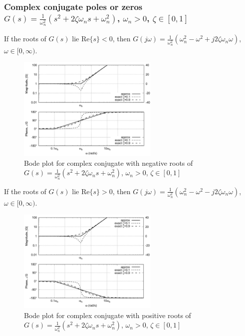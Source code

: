 \documentclass[letterpaper,12pt]{article}
\begin{document}
\subsubsection{Complex conjugate poles or zeros $G(s) = \frac{1}{\omega_{n}^2} (s^2 + 2\zeta \omega_n s + \omega_n^2)$, $\omega_n > 0$, $\zeta \in [0, 1]$}
If the roots of $G(s)$ lie Re$\{s\} < 0$, then $G(j \omega) = \frac{1}{\omega_{n}^2} (\omega_n^2 - \omega^2 + j2\zeta \omega_n \omega)$, $\omega \in [0, \infty)$.
\begin{figure}[h]
    \centering
    \includegraphics[width=0.6\textwidth]{case6 complex conjugate negative.png}
    \caption{Bode plot for complex conjugate with negative roots of $G(s) = \frac{1}{\omega_{n}^2} 
    (s^2 + 2\zeta \omega_n s + \omega_n^2)$, $\omega_n > 0$, $\zeta \in [0, 1]$}
\end{figure}
\FloatBarrier
If the roots of $G(s)$ lie Re$\{s\} > 0$, then $G(j \omega) = \frac{1}{\omega_{n}^2} (\omega_n^2 - \omega^2 - j2\zeta \omega_n \omega)$, $\omega \in [0, \infty)$.
\begin{figure}[h]
    \centering
    \includegraphics[width=0.6\textwidth]{case7 complex conjugate positive.png}
    \caption{Bode plot for complex conjugate with positive roots of $G(s) = \frac{1}{\omega_{n}^2} 
    (s^2 + 2\zeta \omega_n s + \omega_n^2)$, $\omega_n > 0$, $\zeta \in [0, 1]$}
\end{figure}
\FloatBarrier
\end{document}

